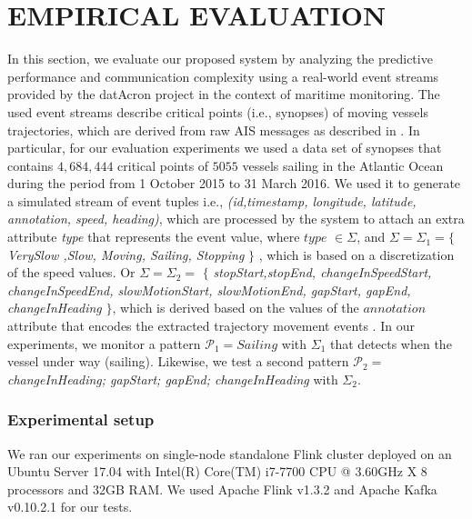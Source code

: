 \section{EMPIRICAL EVALUATION}
\label{sec:results}
In this section, we evaluate our proposed system by analyzing the predictive performance and communication complexity  using a real-world event streams provided by the datAcron project in the context of maritime monitoring. The used event streams describe critical points (i.e., synopses) of moving vessels trajectories, which are derived from raw AIS messages as described in \cite{synopses1}. In particular, for our evaluation experiments we used a data set of synopses that contains $4,684,444$ critical points of $5055$ vessels sailing in the Atlantic Ocean during the period from 1 October 2015 to 31 March 2016. We used it to generate a simulated stream of event tuples  i.e., \textit{(id,timestamp, longitude, latitude, annotation, speed, heading)}, which are processed by the system to attach an extra attribute \textit{type} that represents the event value,  where $type$ $\in \Sigma$,  and $ \Sigma= \Sigma_1=$$\{$\textit{VerySlow ,Slow, Moving, Sailing, Stopping} $\}$ , which is based on a discretization of the speed values. Or $\Sigma=\Sigma_2=$ $\{$  \textit{stopStart,stopEnd, changeInSpeedStart, changeInSpeedEnd, slowMotionStart, slowMotionEnd, gapStart, gapEnd,   changeInHeading} $\}$, which is derived based on the values of the $annotation$ attribute that encodes the extracted trajectory movement events \cite{synopses1}. In our experiments, we monitor a pattern $\mathcal{P}_1=Sailing$ with $\Sigma_1$ that detects when the vessel under way (sailing). Likewise, we test a second pattern  $\mathcal{P}_2=$\textit{changeInHeading; gapStart; gapEnd; changeInHeading} with $\Sigma_2$.


\subsubsection*{Experimental setup} We ran our experiments on single-node standalone Flink cluster deployed on an Ubuntu Server 17.04 with Intel(R) Core(TM) i7-7700 CPU @ 3.60GHz X 8 processors and 32GB RAM. We used Apache Flink v1.3.2 and Apache Kafka v0.10.2.1 for our tests.


